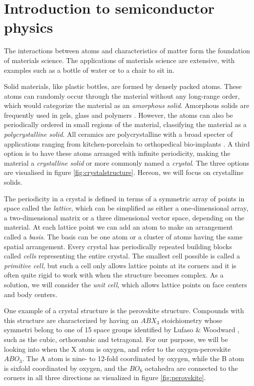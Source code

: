 \section{Introduction to semiconductor physics}

The interactions between atoms and characteristics of matter form the foundation of materials science. The applications of materials science are extensive, with examples such as a bottle of water or to a chair to sit in.

Solid materials, like plastic bottles, are formed by densely packed atoms. These atoms can randomly occur through the material without any long-range order, which would categorize the material as an \textit{amorphous solid}. Amorphous solids are frequently used in gels, glass and polymers \cite{BenStreetman2015}. However, the atoms can also be periodically ordered in small regions of the material, classifying the material as a \textit{polycrystalline solid}. All ceramics are polycrystalline with a broad specter of applications ranging from kitchen-porcelain to orthopedical bio-implants \cite{Renganathan2018}. A third option is to have these atoms arranged with infinite periodicity, making the material a \textit{crystalline solid} or more commonly named a \textit{crystal}. The three options are visualised in figure \ref{fig:crystalstructure}. Hereon, we will focus on crystalline solids.

The periodicity in a crystal is defined in terms of a symmetric array of points in space called the \textit{lattice}, which can be simplified as either a one-dimensional array, a two-dimensional matrix or a three dimensional vector space, depending on the material. At each lattice point we can add an atom to make an arrangement called a \textit{basis}. The basis can be one atom or a cluster of atoms having the same spatial arrangement. Every crystal has periodically repeated building blocks called \textit{cells} representing the entire crystal. The smallest cell possible is called a \textit{primitive cell}, but such a cell only allows lattice points at its corners and it is often quite rigid to work with when the structure becomes complex. As a solution, we will consider the \textit{unit cell}, which allows lattice points on face centers and body centers.

\newpage



\newpage
One example of a crystal structure is the perovskite structure. Compounds with this structure are characterized by having an $ABX_3$ stoichiometry whose symmetri belong to one of 15 space groups identified by Lufaso \& Woodward \cite{Lufaso2001}, such as the cubic, orthorombic and tetragonal. For our purpose, we will be looking into when the X atom is oxygen, and refer to the oxygen-perovskite $ABO_3$. The A atom is nine- to 12-fold coordinated by oxygen, while the B atom is sixfold coordinated by oxygen, and the $BO_6$ octahedra are connected to the corners in all three directions as visualized in figure \ref{fig:perovskite}.


